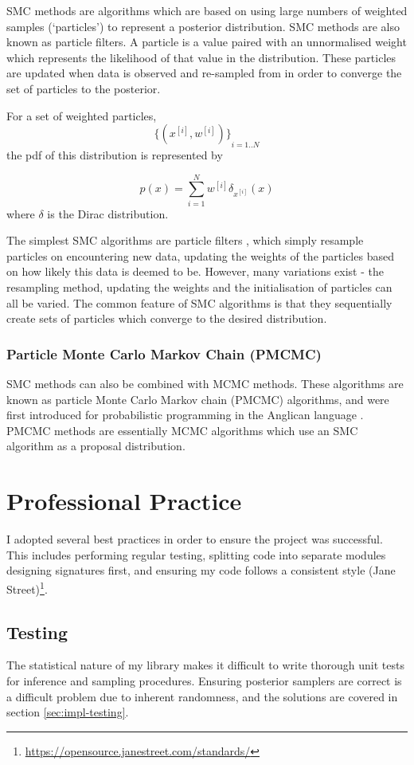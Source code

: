 SMC methods are algorithms which are based on using large numbers of weighted samples (`particles') to represent a posterior distribution. SMC methods are also known as particle filters. A particle is a value paired with an unnormalised weight which represents the likelihood of that value in the distribution. These particles are updated when data is observed and re-sampled from in order to converge the set of particles to the posterior.

For a set of weighted particles, 
\[{\{(x^{[i]}, w^{[i]})\}}_{i=1..N}\]
the pdf of this distribution is represented by

\[
	p(x) = \sum_{i=1}^{N}w^{[i]}\delta_{x^{[i]}}(x)
\]
where $\delta$ is the Dirac distribution.

The simplest SMC algorithms are particle filters \cite{particlefilter}, which simply resample particles on encountering new data, updating the weights of the particles based on how likely this data is deemed to be. However, many variations exist - the resampling method, updating the weights and the initialisation of particles can all be varied. The common feature of SMC algorithms is that they sequentially create sets of particles which converge to the desired distribution.

\subsubsection{Particle Monte Carlo Markov Chain (PMCMC)}
SMC methods can also be combined with MCMC methods. These algorithms are known as particle Monte Carlo Markov chain (PMCMC) algorithms, and were first introduced for probabilistic programming in the Anglican language \cite{anglican-smc}. PMCMC methods are essentially MCMC algorithms which use an SMC algorithm as a proposal distribution.
		
		
\section{Professional Practice}
		
I adopted several best practices in order to ensure the project was successful. This includes performing regular testing, splitting code into separate modules designing signatures first, and ensuring my code follows a consistent style (Jane Street)\footnote{\url{https://opensource.janestreet.com/standards/}}.
		
\subsection{Testing} \label{sec:prep-testing}
The statistical nature of my library makes it difficult to write thorough unit tests for inference and sampling procedures. Ensuring posterior samplers are correct is a difficult problem due to inherent randomness, and the solutions are covered in section \ref{sec:impl-testing}.


